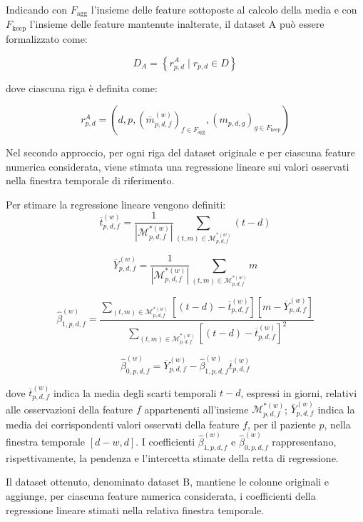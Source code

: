 \documentclass[a4paper,12pt]{report}
\begin{document}
Indicando con \(F_{\mathrm{agg}}\) l'insieme delle feature sottoposte al calcolo della media e con \(F_{\mathrm{keep}}\) l'insieme delle feature mantenute inalterate, il dataset A può essere formalizzato come:

\[
D_A =
\left\{
r^A_{p,d}\mid r_{p,d}\in D
\right\}
\]

dove ciascuna riga è definita come:

\[
r^A_{p,d} =
\left(
d,p,
\left(\overline{m}_{p,d,f}^{(w)}\right)_{f\in F_{\mathrm{agg}}},
\left(m_{p,d,g}\right)_{g\in F_{\mathrm{keep}}}
\right)
\]

Nel secondo approccio, per ogni riga del dataset originale e per ciascuna feature numerica considerata, viene stimata una regressione lineare sui valori osservati nella finestra temporale di riferimento.

Per stimare la regressione lineare vengono definiti:
\[
\overline{t}_{p,d,f}^{(w)}
=
\frac{1}{\left|\mathcal{M}_{p,d,f}^{*(w)}\right|}
\sum_{(t,m)\in\mathcal{M}_{p,d,f}^{*(w)}}
(t-d)
\]

\[
\overline{Y}_{p,d,f}^{(w)}
=
\frac{1}{\left|\mathcal{M}_{p,d,f}^{*(w)}\right|}
\sum_{(t,m)\in\mathcal{M}_{p,d,f}^{*(w)}}
m
\]

\[
\hat{\beta}_{1,p,d,f}^{(w)}
=
\frac{
\displaystyle
\sum_{(t,m)\in\mathcal{M}_{p,d,f}^{*(w)}}
\left[(t-d)-\overline{t}_{p,d,f}^{(w)}\right]
\left[m-\overline{Y}_{p,d,f}^{(w)}\right]
}{
\displaystyle
\sum_{(t,m)\in\mathcal{M}_{p,d,f}^{*(w)}}
\left[(t-d)-\overline{t}_{p,d,f}^{(w)}\right]^2
}
\]

\[
\hat{\beta}_{0,p,d,f}^{(w)}
=
\overline{Y}_{p,d,f}^{(w)}
-
\hat{\beta}_{1,p,d,f}^{(w)}
\overline{t}_{p,d,f}^{(w)}
\]

dove \(\overline{t}_{p,d,f}^{(w)}\) indica la media degli scarti temporali \(t-d\), espressi in giorni, relativi alle osservazioni della feature \(f\) appartenenti all'insieme \(\mathcal{M}_{p,d,f}^{*(w)}\); \(\overline{Y}_{p,d,f}^{(w)}\) indica la media dei corrispondenti valori osservati della feature \(f\), per il paziente \(p\), nella finestra temporale \([d-w,d]\). I coefficienti \(\hat{\beta}_{1,p,d,f}^{(w)}\) e \(\hat{\beta}_{0,p,d,f}^{(w)}\) rappresentano, rispettivamente, la pendenza e l'intercetta stimate della retta di regressione.

Il dataset ottenuto, denominato dataset B, mantiene le colonne originali e aggiunge, per ciascuna feature numerica considerata, i coefficienti della regressione lineare stimati nella relativa finestra temporale.
\end{document}
